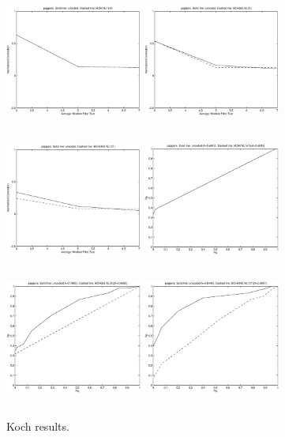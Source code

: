 \documentclass[12pt]{article}
\begin{document}
\begin{figure}[p]
        \includegraphics[height=4.5cm,width=4.5cm]{plot41.eps}
        \includegraphics[height=4.5cm,width=4.5cm]{plot45.eps}
        \includegraphics[height=4.5cm,width=4.5cm]{plot49.eps}
        \includegraphics[height=4.5cm,width=4.5cm]{plot42.eps}
        \includegraphics[height=4.5cm,width=4.5cm]{plot46.eps}
        \includegraphics[height=4.5cm,width=4.5cm]{plot50.eps}
        \caption{Koch results.}
\end{figure}
\end{document}

